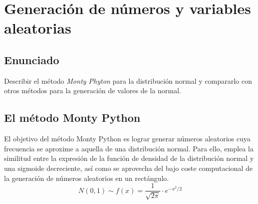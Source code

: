 \documentclass[a4paper,12pt]{article}
\begin{document}
	
	\setlength{\parindent}{0.5cm}
	\setlength{\voffset}{-2cm}
	\setlength{\hoffset}{-2cm}
	
	
	
	\tableofcontents
	
\newpage
	\section{Generación de números y variables aleatorias}
	
	\subsection{Enunciado}
	
	Describir el método \textit{Monty Phyton} para la distribución normal y compararlo con otros métodos para la generación de valores de la normal.
	
	\subsection{El método Monty Python}
	
	El objetivo del método Monty Python es lograr generar números aleatorios cuya frecuencia se aproxime a aquella de una distribución normal. Para ello, emplea la similitud entre la expresión de la función de densidad de la distribución normal y una sigmoide decreciente, así como se aprovecha del bajo coste computacional de la generación de números aleatorios en un rectángulo.
	$$ N(0,1) \sim f(x) = \dfrac{1}{\sqrt{2\pi}} \cdot e^{-x^2/2} $$
	
\end{document}
